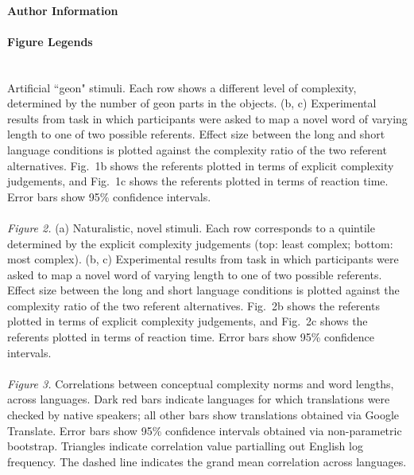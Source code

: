 \documentclass[12pt]{article}
\newcounter{lastnote}
\begin{document}
\paragraph*{Author Information}

\paragraph*{Figure Legends}~ \\

 Artificial ``geon" stimuli. Each row shows a different level of complexity, determined by the number of geon parts in the objects. (b, c) Experimental results from task in which participants were asked to map a novel word of varying length to one of two possible referents. Effect size between the long and short language conditions is plotted against the complexity ratio of the two referent alternatives. Fig.\ 1b shows the referents plotted in terms of explicit complexity judgements, and Fig.\ 1c shows the referents plotted in terms of reaction time. Error bars show 95\% confidence intervals.
 \\
 \\
  {\it Figure 2.} (a) Naturalistic, novel stimuli. Each row corresponds to a quintile determined by the explicit complexity judgements (top: least complex; bottom: most complex). (b, c) Experimental results from task in which participants were asked to map a novel word of varying length to one of two possible referents. Effect size between the long and short language conditions is plotted against the complexity ratio of the two referent alternatives. Fig.\ 2b shows the referents plotted in terms of explicit complexity judgements, and Fig.\ 2c shows the referents plotted in terms of reaction time. Error bars show 95\% confidence intervals.
  \\
  \\ 
 {\it Figure 3.}  Correlations between conceptual complexity norms and word lengths, across languages. Dark red bars indicate languages for which translations were checked by native speakers; all other bars show translations obtained via Google Translate. Error bars show 95\% confidence intervals obtained via non-parametric bootstrap. Triangles indicate correlation value partialling out English log frequency. The dashed line indicates the grand mean correlation across languages.


\end{document}
